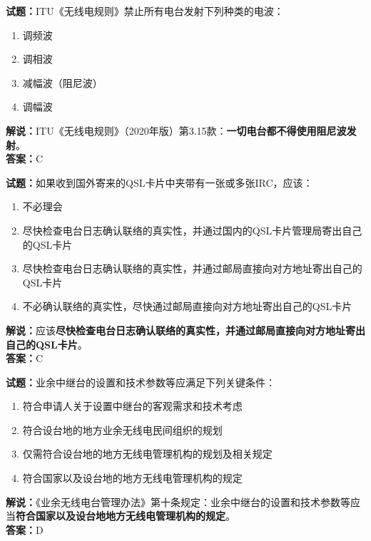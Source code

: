 \documentclass{ctexbook}
\begin{document}
\vspace{\baselineskip}

\noindent\textbf{试题：}ITU《无线电规则》禁止所有电台发射下列种类的电波：
\begin{enumerate}[leftmargin=3em]
  \item 调频波
  \item 调相波
  \item 减幅波（阻尼波）
  \item 调幅波
\end{enumerate}
\noindent\textbf{解说：}ITU《无线电规则》（2020年版）第3.15款：\textbf{一切电台都不得使用阻尼波发射}。\\\noindent\textbf{答案：}C

\vspace{\baselineskip}

\noindent\textbf{试题：}如果收到国外寄来的QSL卡片中夹带有一张或多张IRC，应该：
\begin{enumerate}[leftmargin=3em]
  \item 不必理会
  \item 尽快检查电台日志确认联络的真实性，并通过国内的QSL卡片管理局寄出自己的QSL卡片
  \item 尽快检查电台日志确认联络的真实性，并通过邮局直接向对方地址寄出自己的QSL卡片
  \item 不必确认联络的真实性，尽快通过邮局直接向对方地址寄出自己的QSL卡片
\end{enumerate}
\noindent\textbf{解说：}应该\textbf{尽快检查电台日志确认联络的真实性，并通过邮局直接向对方地址寄出自己的QSL卡片}。\\\noindent\textbf{答案：}C

\vspace{\baselineskip}

\noindent\textbf{试题：}业余中继台的设置和技术参数等应满足下列关键条件：
\begin{enumerate}[leftmargin=3em]
  \item 符合申请人关于设置中继台的客观需求和技术考虑
  \item 符合设台地的地方业余无线电民间组织的规划
  \item 仅需符合设台地的地方无线电管理机构的规划及相关规定
  \item 符合国家以及设台地的地方无线电管理机构的规定
\end{enumerate}
\noindent\textbf{解说：}《业余无线电台管理办法》第十条规定：业余中继台的设置和技术参数等应当\textbf{符合国家以及设台地地方无线电管理机构的规定}。\\\noindent\textbf{答案：}D
\end{document}
